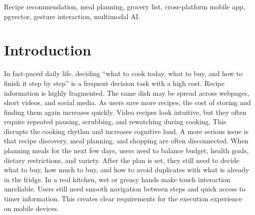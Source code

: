 \documentclass[journal]{IEEEtran}
\begin{document}
\begin{abstract}
This report presents \textbf{Larder}, a cross-platform intelligent recipe application designed to reduce friction across the everyday cooking workflow, from discovering recipes to planning meals, shopping, and in-kitchen execution. Larder addresses common pain points caused by fragmented recipe sources and disconnected planning and grocery decisions by providing an integrated end-to-end journey on iOS and Android. The system combines a React Native (Expo) mobile client with a \mbox{.NET} Web API backend and a PostgreSQL database, supporting persistent user state such as favorites, scheduled meals, shopping items, and dietary constraints. Personalized content discovery is enabled through an embedding-based recommendation pipeline, where offline-generated user and recipe embeddings are stored in \texttt{pgvector} and used for online vector recall with rule-based filtering. To improve practicality in cooking contexts, the step-by-step guidance interface includes timers, keep-awake support, and optional on-device gesture control. Larder also integrates external AI APIs to accelerate common tasks such as recipe drafting from images, ingredient recognition, pantry comparison for missing items, and conversational suggestions, with structured outputs reviewed by users before being committed to app state. The delivered prototype demonstrates a reproducible end-to-end workflow with cross-platform consistency and resilience under imperfect network conditions through local caching and queued synchronization.
\end{abstract}

\begin{IEEEkeywords}
Recipe recommendation, meal planning, grocery list, cross-platform mobile app, pgvector, gesture interaction, multimodal AI.
\end{IEEEkeywords}

\section{Introduction}
In fast-paced daily life, deciding ``what to cook today, what to buy, and how to finish it step by step'' is a frequent decision task with a high cost. Recipe information is highly fragmented. The same dish may be spread across webpages, short videos, and social media. As users save more recipes, the cost of storing and finding them again increases quickly. Video recipes look intuitive, but they often require repeated pausing, scrubbing, and rewatching during cooking. This disrupts the cooking rhythm and increases cognitive load. A more serious issue is that recipe discovery, meal planning, and shopping are often disconnected. When planning meals for the next few days, users need to balance budget, health goals, dietary restrictions, and variety. After the plan is set, they still need to decide what to buy, how much to buy, and how to avoid duplicates with what is already in the fridge. In a real kitchen, wet or greasy hands make touch interaction unreliable. Users still need smooth navigation between steps and quick access to timer information. This creates clear requirements for the execution experience on mobile devices.
\end{document}

